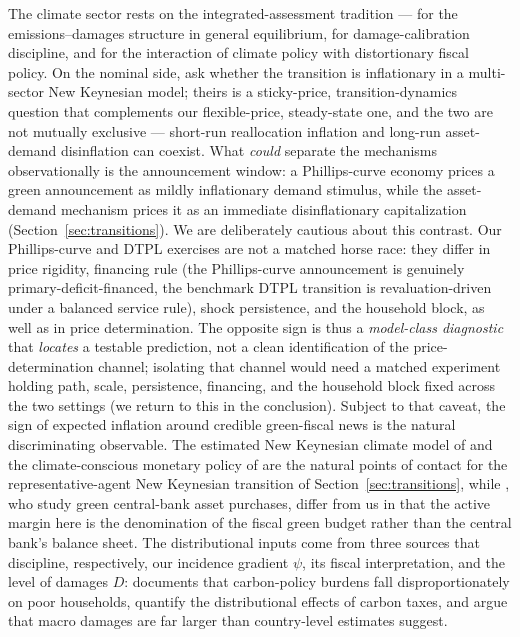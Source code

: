 \documentclass[12pt]{article}
\begin{document}
The climate sector rests on the integrated-assessment tradition ---
\citet{golosov2014} for the emissions--damages structure in general
equilibrium, \citet{nordhaus2017} for damage-calibration discipline, and
\citet{barrage2020} for the interaction of climate policy with distortionary
fiscal policy. On the nominal side, \citet{delnegro2023green} ask whether the
transition is inflationary in a multi-sector New Keynesian model; theirs is a
sticky-price, transition-dynamics question that complements our flexible-price,
steady-state one, and the two are not mutually exclusive --- short-run
reallocation inflation and long-run asset-demand disinflation can coexist.
What \emph{could} separate the mechanisms observationally is the announcement
window: a Phillips-curve economy prices a green announcement as
mildly inflationary demand stimulus, while the asset-demand mechanism
prices it as an immediate disinflationary capitalization
(Section~\ref{sec:transitions}). We are deliberately cautious about this
contrast. Our Phillips-curve and DTPL exercises are not a matched horse race:
they differ in price rigidity, financing rule (the Phillips-curve announcement
is genuinely primary-deficit-financed, the benchmark DTPL transition is
revaluation-driven under a balanced service rule), shock persistence, and the
household block, as well as in price determination. The opposite sign is thus a
\emph{model-class diagnostic} that \emph{locates} a testable prediction, not a
clean identification of the price-determination channel; isolating that channel
would need a matched experiment holding path, scale, persistence, financing, and
the household block fixed across the two settings (we return to this in the
conclusion). Subject to that caveat, the sign of expected inflation around
credible green-fiscal news is the natural discriminating observable. The estimated New Keynesian
climate model of \citet{sahucsmetsvermandel2024} and the climate-conscious
monetary policy of \citet{nakovthomas2026} are the natural points of contact
for the representative-agent New Keynesian transition of
Section~\ref{sec:transitions}, while \citet{ferrarinispilandi2023}, who study
green central-bank asset purchases, differ from us in that the active margin
here is the denomination of the fiscal green budget rather than the central
bank's balance sheet. The distributional inputs come from three sources that
discipline, respectively, our incidence gradient $\psi$, its fiscal
interpretation, and the level of damages $D$: \citet{kanzig2023carbon}
documents that carbon-policy burdens fall disproportionately on poor
households, \citet{fried2018} quantify the distributional effects of carbon
taxes, and \citet{bilalkanzig2024} argue that macro damages are far larger than
country-level estimates suggest.
\end{document}
